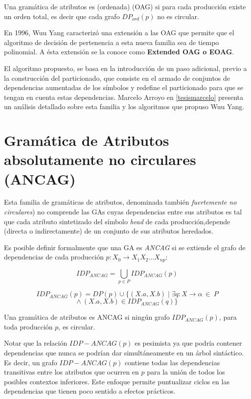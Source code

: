 \begin{definition} Una gramática de atributos es (ordenada) (OAG) si para cada producción existe un orden total, es decir que cada grafo $ DP_{ord}(p) $ no es circular.
\end{definition}

En 1996, Wuu Yang\cite{wuu-yang4} caracterizó una extensión a las OAG que permite que el algoritmo de decisión de pertenencia a esta nueva familia sea de tiempo polinomial. A ésta extensión se la conoce como \textbf{Extended OAG o EOAG}.

El algoritmo propuesto, se basa en la introducción de un paso adicional, previo a la construcción del particionado, que consiste en el armado de conjuntos de dependencias aumentadas de los símbolos y redefine el particionado para que se tengan en cuenta estas dependencias.
Marcelo Arroyo en \ref{tesismarcelo} presenta un análisis detallado sobre esta familia y  los algoritmos que propuso Wuu Yang.

\section{Gramática de Atributos absolutamente no circulares (ANCAG)}

Esta familia de gramáticas de atributos, denominada también \emph{fuertemente no circulares}) no comprende las GAs cuyas dependencias entre sus atributos es tal que cada atributo sintetizado del símbolo \textit{head} de cada producción,depende (directa o indirectamente) de un conjunto de sus atributos heredados.

Es posible definir formalmente que una GA es \emph{ANCAG} si se extiende el grafo de dependencias de cada producción $p: X_0 \rightarrow X_1 X_2 \ldots X_{np}$:

$$ IDP_{ANCAG} = \bigcup_{p \in P} IDP_{ANCAG}(p) $$

$$ IDP_{ANCAG}(p) = DP(p) \cup \{ (X.a,X.b) \mid
                             \exists q: X \rightarrow \alpha \: \in \: P $$
                $$ \land \: (X.a,X.b) \in IDP_{ANCAG}(q) \} $$

\begin{definition} Una gramática de atributos es ANCAG si ningún grafo $ IDP_{ANCAG}(p) $, para toda producción $p$, es circular.
\end{definition}

Notar que la relación $IDP-ANCAG(p)$ es pesimista ya que podría contener dependencias que nunca se podrían dar simultáneamente en un árbol sintáctico. Es decir, un grafo $IDP-ANCAG(p)$ contiene todas las dependencias transitivas entre los atributos que ocurren en $p$ para la unión de todos los posibles contextos inferiores. Este enfoque permite puntualizar ciclos en las dependencias que tienen poco sentido a efectos prácticos.

